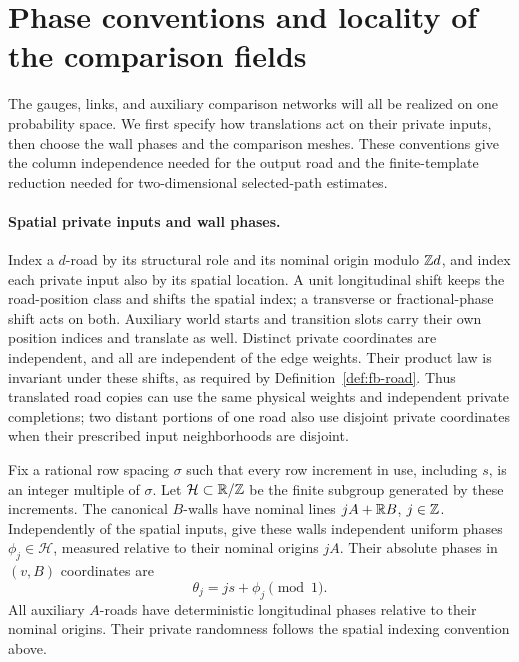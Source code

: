 \section{Phase conventions and locality of the comparison fields}
\label{phases:section}

The gauges, links, and auxiliary comparison networks will all be realized
on one probability space.  We first specify how translations act on their
private inputs, then choose the wall phases and the comparison meshes.
These conventions give the column independence needed for the output
road and the finite-template reduction needed for two-dimensional
selected-path estimates.

\paragraph{Spatial private inputs and wall phases.}
Index a $d$-road by its structural role and its nominal origin modulo
$\mathbb Z d$, and index each private input also by its spatial location.
A unit longitudinal shift keeps the road-position class and shifts the
spatial index; a transverse or fractional-phase shift acts on both.
Auxiliary world starts and transition slots carry their own position
indices and translate as well. Distinct private coordinates are
independent, and all are independent of the edge weights. Their product
law is invariant under these shifts, as required by
Definition~\ref{def:fb-road}. Thus translated road copies
can use the same physical weights and independent private completions;
two distant portions of one road also use disjoint private coordinates
when their prescribed input neighborhoods are disjoint.

Fix a rational row spacing $\sigma$ such that every row increment in use,
including $s$, is an integer multiple of $\sigma$.  Let
$\mathcal H\subset\mathbb R/\mathbb Z$ be the finite subgroup generated by these
increments.  The canonical $B$-walls have nominal lines
$jA+\mathbb R B$, $j\in\mathbb Z$.  Independently of the spatial inputs, give these
walls independent uniform phases $\phi_j\in\mathcal H$, measured
relative to their nominal origins $jA$.  Their absolute phases in
$(v,B)$ coordinates are
\[
                         \theta_j=js+\phi_j\pmod 1.
\]
All auxiliary $A$-roads have deterministic longitudinal phases relative
to their nominal origins.  Their private randomness follows the spatial
indexing convention above.

